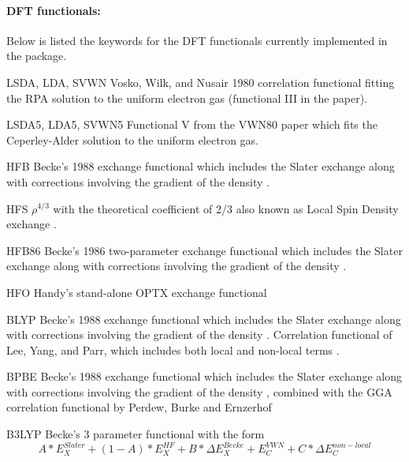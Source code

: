 \paragraph{DFT functionals:}
Below is listed the keywords for the DFT functionals currently implemented in the package.
\begin{keywordlist}
\item[LSDA, LDA, SVWN]
Vosko, Wilk, and Nusair 1980 correlation functional fitting the
RPA solution to the uniform electron gas \cite{Vosko:80} (functional III in the paper).
\item[LSDA5, LDA5, SVWN5]
Functional V from the VWN80 paper \cite{Vosko:80} which fits the Ceperley-Alder solution to the uniform electron gas.
\item[HFB]
Becke's 1988 exchange functional which includes
the Slater exchange along with corrections involving the gradient of the density \cite{Becke:88}.
\item[HFS]
$\rho ^{4/3}$ with the theoretical coefficient of 2/3 also known as Local Spin Density exchange
\cite{Hohenberg:64,Kohn:65,Slater:74}.
\item[HFB86]
Becke's 1986 two-parameter exchange functional which includes
the Slater exchange along with corrections involving the gradient of the density \cite{B86,B07}.
\item[HFO]
Handy's stand-alone OPTX exchange functional \cite{OPTX}
\item[BLYP]
Becke's 1988 exchange functional which includes
the Slater exchange along with corrections involving the gradient of the density \cite{Becke:88}.
Correlation functional of Lee, Yang, and Parr, which includes both local and non-local terms \cite{Lee:88,Miehlich:89}.
\item[BPBE]
Becke's 1988 exchange functional which includes
the Slater exchange along with corrections involving the gradient of the density \cite{Becke:88} ,
combined with the GGA correlation functional by Perdew, Burke and Ernzerhof  \cite{PBE:96}
\item[B3LYP]
Becke's 3 parameter functional \cite{Becke:93} with the form
\begin{equation}
A*E_X ^{Slater} + (1-A)*E_X ^{HF} + B*\Delta E_X ^{Becke} + E_C ^{VWN} + C*\Delta E_C ^{non-local}

\end{equation}
\end{keywordlist}
